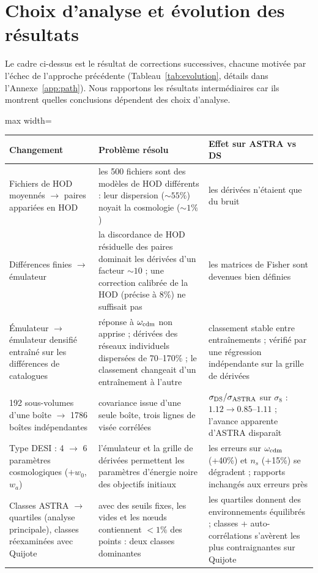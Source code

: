 \section{Choix d'analyse et évolution des résultats}
\label{sec:choices}

Le cadre ci-dessus est le résultat de corrections successives, chacune motivée par l'échec de l'approche précédente (Tableau~\ref{tab:evolution}, détails dans l'Annexe~\ref{app:path}). Nous rapportons les résultats intermédiaires car ils montrent quelles conclusions dépendent des choix d'analyse.

\begin{table}[!tp]
\centering\small
\begin{adjustbox}{max width=\textwidth}
\begin{tabular}{p{4.2cm}p{6.3cm}p{6.3cm}}
\toprule
Changement & Problème résolu & Effet sur ASTRA vs DS \\
\midrule
Fichiers de HOD moyennés $\to$ paires appariées en HOD & les 500 fichiers sont des modèles de HOD différents : leur dispersion ($\sim55\%$) noyait la cosmologie ($\sim1\%$) & les dérivées n'étaient que du bruit \\
Différences finies $\to$ émulateur & la discordance de HOD résiduelle des paires dominait les dérivées d'un facteur $\sim10$ ; une correction calibrée de la HOD (précise à 8\%) ne suffisait pas & les matrices de Fisher sont devenues bien définies \\
Émulateur $\to$ émulateur densifié entraîné sur les différences de catalogues & réponse à $\omega_{\rm cdm}$ non apprise ; dérivées des réseaux individuels dispersées de 70--170\% ; le classement changeait d'un entraînement à l'autre & classement stable entre entraînements ; vérifié par une régression indépendante sur la grille de dérivées \\
192 sous-volumes d'une boîte $\to$ 1786 boîtes indépendantes & covariance issue d'une seule boîte, trois lignes de visée corrélées & $\sigma_{\rm DS}/\sigma_{\rm ASTRA}$ sur $\sigma_8$ : $1.12\to0.85$--$1.11$ ; l'avance apparente d'ASTRA disparaît \\
Type DESI : 4 $\to$ 6 paramètres cosmologiques ($+w_0$, $w_a$) & l'émulateur et la grille de dérivées permettent les paramètres d'énergie noire des objectifs initiaux & les erreurs sur $\omega_{\rm cdm}$ (+40\%) et $n_s$ (+15\%) se dégradent ; rapports inchangés aux erreurs près \\
Classes ASTRA $\to$ quartiles (analyse principale), classes réexaminées avec Quijote & avec des seuils fixes, les vides et les nœuds contiennent $<1\%$ des points : deux classes dominantes & les quartiles donnent des environnements équilibrés ; classes + auto-corrélations s'avèrent les plus contraignantes sur Quijote \\

\end{tabular}
\end{adjustbox}
\end{table}
